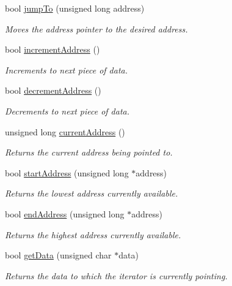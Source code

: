 \begin{DoxyCompactItemize}
\item 
bool \hyperlink{classintelhex_a83b54457c121b0f35b21b78fa2ecd712}{jump\-To} (unsigned long address)
\begin{DoxyCompactList}\small\item\em Moves the address pointer to the desired address. \end{DoxyCompactList}\item 
bool \hyperlink{classintelhex_af9c6e296e5053fe8378e79445cf480cb}{increment\-Address} ()
\begin{DoxyCompactList}\small\item\em Increments to next piece of data. \end{DoxyCompactList}\item 
bool \hyperlink{classintelhex_a51f6d93f1ac2bdf5ddad8be4e1827ce9}{decrement\-Address} ()
\begin{DoxyCompactList}\small\item\em Decrements to next piece of data. \end{DoxyCompactList}\item 
unsigned long \hyperlink{classintelhex_a631d8930daeaf04bf0d9ad9c25679a0b}{current\-Address} ()
\begin{DoxyCompactList}\small\item\em Returns the current address being pointed to. \end{DoxyCompactList}\item 
bool \hyperlink{classintelhex_aa8833665b99f0b6ac64fcef7d2116c42}{start\-Address} (unsigned long $\ast$address)
\begin{DoxyCompactList}\small\item\em Returns the lowest address currently available. \end{DoxyCompactList}\item 
bool \hyperlink{classintelhex_a9b159bea81eb832e37f6cf88a57ca659}{end\-Address} (unsigned long $\ast$address)
\begin{DoxyCompactList}\small\item\em Returns the highest address currently available. \end{DoxyCompactList}\item 
bool \hyperlink{classintelhex_a01f7799f7a86e45c28b713e9472a8a5a}{get\-Data} (unsigned char $\ast$data)
\begin{DoxyCompactList}\small\item\em Returns the data to which the iterator is currently pointing. \end{DoxyCompactList}\item 

\end{DoxyCompactItemize}

